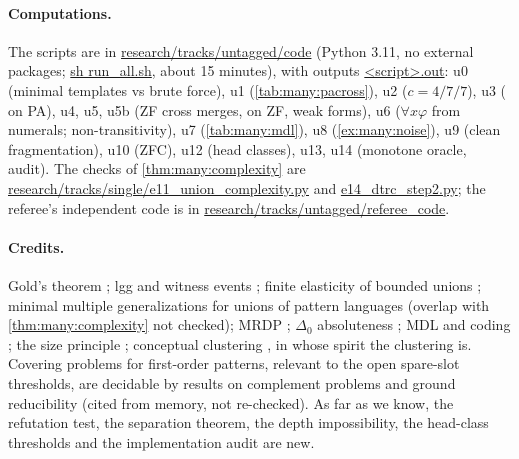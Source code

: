 \paragraph{Computations.} The scripts are in \url{research/tracks/untagged/code} (Python 3.11, no external packages;
\url{sh run_all.sh}, about 15 minutes), with outputs \url{<script>.out}: u0 (minimal templates vs brute force), u1
(\cref{tab:many:pacross}), u2 ($c=4/7/7$), u3 (\DTRC{} on PA), u4, u5, u5b (ZF cross merges, \DTRC{} on ZF, weak forms), u6
($\forall x\varphi$ from numerals; non-transitivity), u7 (\cref{tab:many:mdl}), u8 (\cref{ex:many:noise}), u9 (clean
fragmentation), u10 (ZFC), u12 (head classes), u13, u14 (monotone oracle, audit). The checks of \cref{thm:many:complexity} are
\url{research/tracks/single/e11_union_complexity.py} and \url{e14_dtrc_step2.py}; the referee's independent code is in
\url{research/tracks/untagged/referee_code}.

\paragraph{Credits.} Gold's theorem \citep{gold1967language}; lgg and witness events
\citep{plotkin1970note,reynolds1970transformational}; finite elasticity of bounded unions
\citep{wright1989identification,motoki1991correct}; minimal multiple generalizations for unions of pattern languages
\citep{arimura1994finding} (overlap with \cref{thm:many:complexity} not checked); MRDP
\citep{davis1961decision,matiyasevich1993hilbert}; $\Delta_0$ absoluteness \citep{kunen1980set,jech2003set}; MDL and coding
\citep{rissanen1978modeling,rissanen1986stochastic,clarke1990information,krichevsky1981performance,grunwald2007minimum}; the size
principle \citep{tenenbaum2001generalization}; conceptual clustering \citep{michalski1983learning}, in whose spirit the
clustering is. Covering problems for first-order patterns, relevant to the open spare-slot thresholds, are decidable by
results on complement problems and ground reducibility \citep{lassez1987explicit,comon2003ground} (cited from memory, not
re-checked). As far as we know, the refutation test, the separation theorem, the depth impossibility, the head-class
thresholds and the implementation audit are new.
